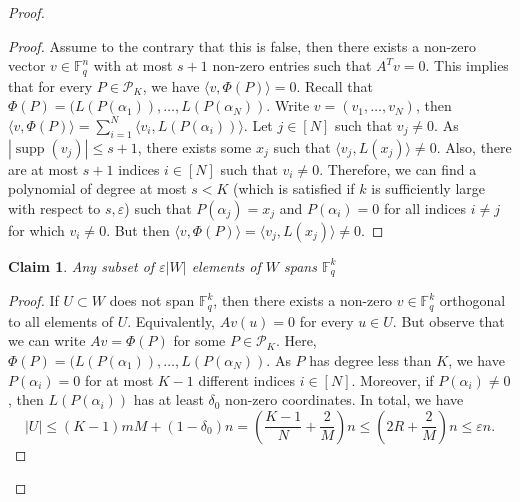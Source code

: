 \documentclass[11pt]{article}
\theoremstyle{plain}
\newtheorem{claim}[theorem]{Claim}
\theoremstyle{definition}
\DeclareMathOperator{\supp}{supp}
\begin{document}
\begin{proof}
 \begin{proof} Assume to the contrary that this is false, then there exists a non-zero vector $v \in \mathbb{F}_q^n$ with at most $s+1$ non-zero entries such that $A^T v = 0$. This implies that for every $P\in \mathcal{P}_K$, we have $\langle v,\Phi(P)\rangle=0$. Recall that $\Phi(P)=(L(P(\alpha_1)),\dots,L(P(\alpha_N))$. Write $v=(v_1,\dots,v_N)$, then 
$\langle v,\Phi(P)\rangle=\sum_{i=1}^N \langle v_i,L(P(\alpha_i))\rangle$.
Let $j\in [N]$ such that $v_j\neq 0$. As $|\supp(v_j)|\leq s+1$, there exists some $x_j$ such that $\langle v_j,L(x_j)\rangle\neq 0$. Also, there are at most $s+1$ indices $i\in [N]$ such that $v_i\neq 0$. Therefore, we can find a polynomial of degree at most $s < K$ (which is satisfied if  $k$ is sufficiently large with respect to $s,\varepsilon$) such that $P(\alpha_j)=x_j$ and $P(\alpha_i)=0$ for all indices $i\neq j$ for which $v_i \neq 0$. But then $\langle v,\Phi(P)\rangle=\langle v_j,L(x_j)\rangle\neq 0$.
 \end{proof}
 
 
\begin{claim} 
Any subset of $\varepsilon|W|$ elements of $W$ spans $\mathbb{F}_q^k$
\end{claim} 
\begin{proof} 
If $U\subset W$ does not span $\mathbb{F}_q^k$, then there exists a non-zero $v\in \mathbb{F}_q^k$ orthogonal to all elements of $U$. Equivalently, $Av(u)=0$ for every $u\in U$. But observe that we can write  $Av=\Phi(P)$ for some $P\in \mathcal{P}_K$. Here, $\Phi(P)=(L(P(\alpha_1)),\dots,L(P(\alpha_N))$. As $P$ has degree less than $K$, we have $P(\alpha_i)=0$ for at most $K-1$ different indices $i\in [N]$. Moreover, if $P(\alpha_i)\neq 0$, then $L(P(\alpha_i))$ has at least $\delta_0$ non-zero coordinates. In total, we have
$$|U|\leq (K-1)mM+(1-\delta_0)n=\left(\frac{K-1}{N}+\frac{2}{M}\right)n\leq \left(2R+\frac{2}{M}\right)n\leq \varepsilon n.$$
\end{proof}

\end{proof}
\end{document}
